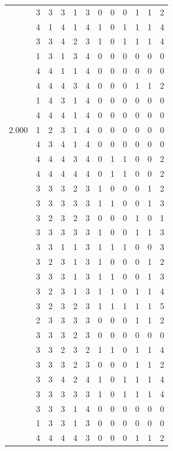 \documentclass[]{msu-thesis}
\theoremstyle{definition}
\theoremstyle{definition}
\theoremstyle{definition}
\theoremstyle{remark}
\begin{document}
\begin{table}
{\begin{tabular}[t]{rrrrrrrrrrrr}
 & 3 & 3 & 3 & 1 & 3 & 0 & 0 & 0 & 1 & 1 & 2\\
 & 4 & 1 & 4 & 1 & 4 & 1 & 0 & 1 & 1 & 1 & 4\\
 & 3 & 3 & 4 & 2 & 3 & 1 & 0 & 1 & 1 & 1 & 4\\
 & 1 & 3 & 1 & 3 & 4 & 0 & 0 & 0 & 0 & 0 & 0\\
 & 4 & 4 & 1 & 1 & 4 & 0 & 0 & 0 & 0 & 0 & 0\\
 & 4 & 4 & 4 & 3 & 4 & 0 & 0 & 0 & 1 & 1 & 2\\
 & 1 & 4 & 3 & 1 & 4 & 0 & 0 & 0 & 0 & 0 & 0\\
 & 4 & 4 & 4 & 1 & 4 & 0 & 0 & 0 & 0 & 0 & 0\\
2.000 & 1 & 2 & 3 & 1 & 4 & 0 & 0 & 0 & 0 & 0 & 0\\
 & 4 & 3 & 4 & 1 & 4 & 0 & 0 & 0 & 0 & 0 & 0\\
 & 4 & 4 & 4 & 3 & 4 & 0 & 1 & 1 & 0 & 0 & 2\\
 & 4 & 4 & 4 & 4 & 4 & 0 & 1 & 1 & 0 & 0 & 2\\
 & 3 & 3 & 3 & 2 & 3 & 1 & 0 & 0 & 0 & 1 & 2\\
 & 3 & 3 & 3 & 3 & 3 & 1 & 1 & 0 & 0 & 1 & 3\\
 & 3 & 2 & 3 & 2 & 3 & 0 & 0 & 0 & 1 & 0 & 1\\
 & 3 & 3 & 3 & 3 & 3 & 1 & 0 & 0 & 1 & 1 & 3\\
 & 3 & 3 & 1 & 1 & 3 & 1 & 1 & 1 & 0 & 0 & 3\\
 & 3 & 2 & 3 & 1 & 3 & 1 & 0 & 0 & 0 & 1 & 2\\
 & 3 & 3 & 3 & 1 & 3 & 1 & 1 & 0 & 0 & 1 & 3\\
 & 3 & 2 & 3 & 1 & 3 & 1 & 1 & 0 & 1 & 1 & 4\\
 & 3 & 2 & 3 & 2 & 3 & 1 & 1 & 1 & 1 & 1 & 5\\
 & 2 & 3 & 3 & 3 & 3 & 0 & 0 & 0 & 1 & 1 & 2\\
 & 3 & 3 & 3 & 2 & 3 & 0 & 0 & 0 & 0 & 0 & 0\\
 & 3 & 3 & 2 & 3 & 2 & 1 & 1 & 0 & 1 & 1 & 4\\
 & 3 & 3 & 3 & 2 & 3 & 0 & 0 & 0 & 1 & 1 & 2\\
 & 3 & 3 & 4 & 2 & 4 & 1 & 0 & 1 & 1 & 1 & 4\\
 & 3 & 3 & 3 & 3 & 3 & 1 & 0 & 1 & 1 & 1 & 4\\
 & 3 & 3 & 3 & 1 & 4 & 0 & 0 & 0 & 0 & 0 & 0\\
 & 1 & 3 & 3 & 1 & 3 & 0 & 0 & 0 & 0 & 0 & 0\\
 & 4 & 4 & 4 & 4 & 3 & 0 & 0 & 0 & 1 & 1 & 2\\

\end{tabular}}
\end{table}
\end{document}
